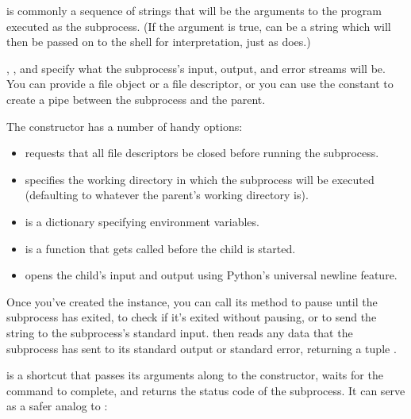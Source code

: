 \documentclass{howto}
\begin{document}
 is commonly a sequence of strings that will be the
arguments to the program executed as the subprocess.  (If the
 argument is true,  can be a string which will
then be passed on to the shell for interpretation, just as
 does.)

, , and  specify what the
subprocess's input, output, and error streams will be.  You can
provide a file object or a file descriptor, or you can use the
constant  to create a pipe between the
subprocess and the parent.

The constructor has a number of handy options:

\begin{itemize}
  \item {} requests that all file descriptors be closed
  before running the subprocess.

  \item {} specifies the working directory in which the
  subprocess will be executed (defaulting to whatever the parent's
  working directory is).

  \item {} is a dictionary specifying environment variables.

  \item {} is a function that gets called before the
  child is started.

  \item {} opens the child's input and output
  using Python's universal newline feature.

\end{itemize}

Once you've created the  instance, 
you can call its  method to pause until the subprocess
has exited,  to check if it's exited without pausing, 
or  to send the string  to
the subprocess's standard input.    
then reads any data that the subprocess has sent to its standard output 
or standard error, returning a tuple .

 is a shortcut that passes its arguments along to the
 constructor, waits for the command to complete, and
returns the status code of the subprocess.  It can serve as a safer
analog to :
\end{document}
